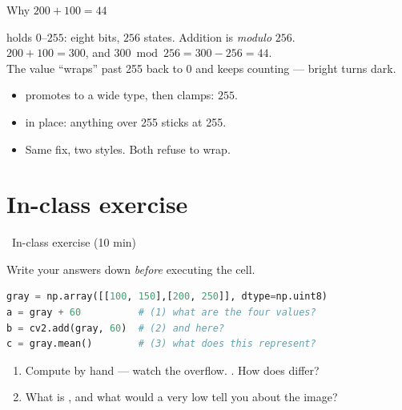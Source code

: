 \documentclass[10pt,aspectratio=169]{beamer}
\begin{document}
\begin{frame}{Why $200 + 100 = 44$}
  \begin{mathbox}
     holds \(0\)--\(255\): eight bits, \(256\) states. Addition is \emph{modulo} \(256\). \\[3pt]
    \(200 + 100 = 300\), and \(300 \bmod 256 = 300 - 256 = 44.\) \\[3pt]
    The value ``wraps'' past 255 back to 0 and keeps counting — bright turns dark.
  \end{mathbox}
  \begin{itemize}
    \item {} promotes to a wide type, then clamps: \(255\).
    \item {}  in place: anything over 255 sticks at 255.
    \item Same fix, two styles. Both refuse to wrap.
  \end{itemize}
\end{frame}

\section{In-class exercise}

\begin{frame}[fragile]{\faPen~In-class exercise (10 min)}
  \begin{infobox}
    Write your answers down \emph{before} executing the cell.
  \end{infobox}
\begin{lstlisting}[language=Python]
gray = np.array([[100, 150],[200, 250]], dtype=np.uint8)
a = gray + 60          # (1) what are the four values?
b = cv2.add(gray, 60)  # (2) and here?
c = gray.mean()        # (3) what does this represent?
\end{lstlisting}
  \begin{enumerate}
    \item Compute  by hand — watch the overflow. . How does  differ?
    \item What is , and what would a very low  tell you about the image?
  \end{enumerate}
\end{frame}
\end{document}
